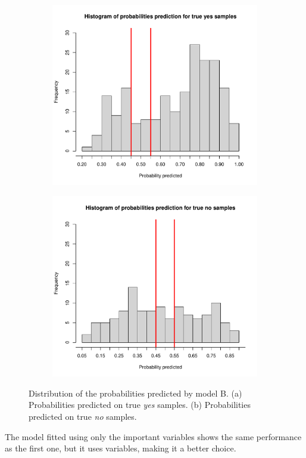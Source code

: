 \begin{figure}[H]
	\begin{subfigure}{.5\textwidth}
		\centering
		\includegraphics[width=0.7\linewidth]{ImageFiles/Classification/LogReg/probability_pred_imp_yes}
		\caption{}
		\label{fig:ProbPredYesB}
	\end{subfigure}
	\begin{subfigure}{.5\textwidth}
		\centering
		\includegraphics[width=0.7\linewidth]{ImageFiles/Classification/LogReg/probability_pred_imp_no}
		\caption{}
		\label{fig:ProbPredNoB}
	\end{subfigure}
	\caption{Distribution of the probabilities predicted by model B. (a) Probabilities predicted on true \textit{yes} samples. (b) Probabilities predicted on true \textit{no} samples.}
	\label{fig:ProbPredB}
\end{figure}

The model fitted using only the important variables shows the same performance as the first one, but it uses variables, making it a better choice.

